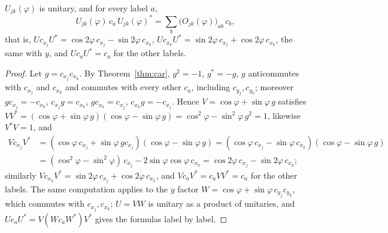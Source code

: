 \begin{theorem}\label{thm:gate}
$U_{jk}(\varphi)$ is unitary, and for every label $a$,
\[
 U_{jk}(\varphi)\,c_a\,U_{jk}(\varphi)^*=\sum_b\bigl(O_{jk}(\varphi)\bigr)_{ab}\,c_b ,
\]
that is, $U c_{x_j}U^*=\cos2\varphi\,c_{x_j}-\sin2\varphi\,c_{x_k}$,
$U c_{x_k}U^*=\sin2\varphi\,c_{x_j}+\cos2\varphi\,c_{x_k}$, the same with $y$, and
$Uc_aU^*=c_a$ for the other labels.
\end{theorem}
\begin{proof}
Let $g=c_{x_j}c_{x_k}$. By Theorem~\ref{thm:car}, $g^2=-1$, $g^*=-g$, $g$ anticommutes with
$c_{x_j}$ and $c_{x_k}$ and commutes with every other $c_a$, including $c_{y_j},c_{y_k}$;
moreover $gc_{x_j}=-c_{x_k}$, $c_{x_j}g=c_{x_k}$, $gc_{x_k}=c_{x_j}$, $c_{x_k}g=-c_{x_j}$.
Hence $V=\cos\varphi+\sin\varphi\,g$ satisfies
$VV^*=(\cos\varphi+\sin\varphi\,g)(\cos\varphi-\sin\varphi\,g)=\cos^2\varphi-\sin^2\varphi\,g^2=1$,
likewise $V^*V=1$, and
\begin{align*}
 Vc_{x_j}V^*&=(\cos\varphi\,c_{x_j}+\sin\varphi\,gc_{x_j})(\cos\varphi-\sin\varphi\,g)
 =(\cos\varphi\,c_{x_j}-\sin\varphi\,c_{x_k})(\cos\varphi-\sin\varphi\,g)\\
 &=(\cos^2\varphi-\sin^2\varphi)\,c_{x_j}-2\sin\varphi\cos\varphi\,c_{x_k}=\cos2\varphi\,c_{x_j}-\sin2\varphi\,c_{x_k};
\end{align*}
similarly $Vc_{x_k}V^*=\sin2\varphi\,c_{x_j}+\cos2\varphi\,c_{x_k}$, and $Vc_aV^*=c_aVV^*=c_a$
for the other labels. The same computation applies to the $y$ factor
$W=\cos\varphi+\sin\varphi\,c_{y_j}c_{y_k}$, which commutes with $c_{x_j},c_{x_k}$; $U=VW$ is unitary as a product of
unitaries, and $Uc_aU^*=V(Wc_aW^*)V^*$ gives the formulas label by label.
\end{proof}

